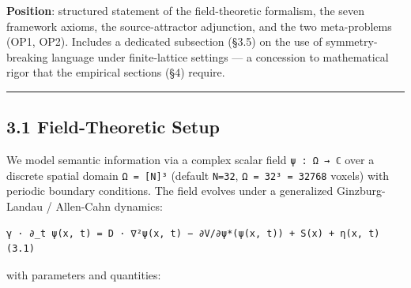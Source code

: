 \documentclass[
]{article}
\begin{document}
\textbf{Position}: structured statement of the field-theoretic
formalism, the seven framework axioms, the source-attractor adjunction,
and the two meta-problems (OP1, OP2). Includes a dedicated subsection
(§3.5) on the use of symmetry-breaking language under finite-lattice
settings --- a concession to mathematical rigor that the empirical
sections (§4) require.

\begin{center}\rule{0.5\linewidth}{0.5pt}\end{center}

\hypertarget{field-theoretic-setup}{%
\subsection{3.1 Field-Theoretic Setup}\label{field-theoretic-setup}}

We model semantic information via a complex scalar field
\texttt{ψ\ :\ Ω\ →\ ℂ} over a discrete spatial domain
\texttt{Ω\ =\ {[}N{]}³} (default \texttt{N=32},
\texttt{\textbar{}Ω\textbar{}\ =\ 32³\ =\ 32768} voxels) with periodic
boundary conditions. The field evolves under a generalized
Ginzburg-Landau / Allen-Cahn dynamics:

\begin{verbatim}
γ · ∂_t ψ(x, t) = D · ∇²ψ(x, t) − ∂V/∂ψ*(ψ(x, t)) + S(x) + η(x, t)         (3.1)
\end{verbatim}

with parameters and quantities:
\end{document}
